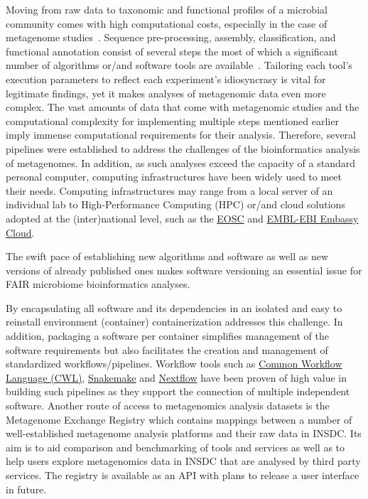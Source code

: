       Moving from raw data to taxonomic and functional profiles of a microbial community comes with high computational costs, especially in the case of metagenome studies~\cite{yang2021review}.
      Sequence pre-processing, assembly, classification, and functional annotation consist of several steps the most of which a significant number of algorithms or/and software tools are available~\cite{breitwieser2019review, roumpeka2017review}. 
      Tailoring each tool's execution parameters to reflect each experiment's idiosyncrasy is vital for legitimate findings, yet it makes analyses of metagenomic data even more complex. 
      The vast amounts of data that come with metagenomic studies and the computational complexity for implementing multiple steps mentioned earlier imply immense computational requirements for their analysis. 
      Therefore, several pipelines were 
      established to address the challenges of the bioinformatics analysis of metagenomes. 
      In addition, as such analyses exceed the capacity of a standard personal computer, computing infrastructures have been widely used to meet their needs. 
      Computing infrastructures may range from a local server of an individual lab to High-Performance Computing (HPC) or/and cloud solutions adopted at the (inter)national level, such as the \href{https://eosc-portal.eu}{EOSC} and 
      \href{https://www.embassycloud.org}{EMBL-EBI Embassy Cloud}. 

      The swift pace of establishing new algorithms and software as well as new versions of already published ones makes software versioning an essential issue for FAIR microbiome bioinformatics analyses. 


      By encapsulating all software and its dependencies in an isolated and easy to reinstall environment (container) containerization addresses this challenge. In addition, packaging a software per container simplifies management of the software requirements but also facilitates the creation and management of standardized workflows/pipelines. Workflow tools such as 
      \href{https://github.com/common-workflow-language/common-workflow-language}{Common Workflow Language (CWL)}, 
      \href{https://snakemake.github.io}{Snakemake} and \href{https://www.nextflow.io}{Nextflow} have been proven of high value in building such pipelines as they support the connection of multiple independent software.
      Another route of access to metagenomics analysis datasets is the Metagenome Exchange Registry which contains mappings between a number of well-established metagenome analysis platforms and their raw data in INSDC. Its aim is to aid comparison and benchmarking of tools and services as well as to help users explore metagenomics data in INSDC that are analysed by third party services. The registry is available as an API with plans to release a user interface in future.




